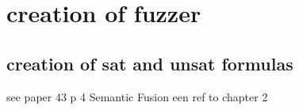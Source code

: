 \chapter{creation of fuzzer}
\label{cha:6}


\section{creation of sat and unsat formulas}
see paper 43 p 4
Semantic Fusion
\cite{43YinYang}
een ref to chapter 2

%
%
%
%
%

